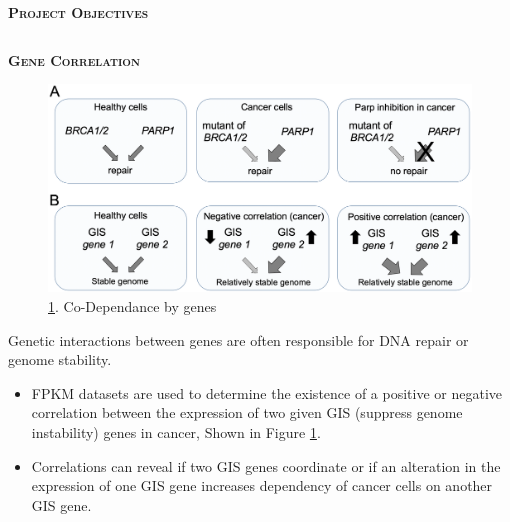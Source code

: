 \documentclass[final,t]{beamer}
\begin{document}
\begin{frame}{}
\begin{columns}[t]
\begin{column}{1\linewidth}
\begin{block}{\textsc{\textbf{Project Objectives}}}
                    \vspace*{6mm}
                \end{block}
			\end{column}
		\end{columns}


		\begin{columns}

%
%
            \begin{column}{.5\linewidth}
%
%
			\begin{block}{\textsc{\textbf{Gene Correlation}}}
				\vspace*{3mm}
				\begin{figure}
					\centering
					\includegraphics[scale = 0.6]{graphics/braca.png}
					\caption{\ref{fig:braca}. Co-Dependance by genes}
					\label{fig:braca}
					\end{figure}
Genetic interactions between genes are often responsible for DNA repair or genome stability.

				\begin{itemize}
					\item FPKM datasets are used to determine the existence of a positive or negative correlation between the expression of two given GIS (suppress genome instability) genes in cancer, Shown in Figure \ref{fig:braca}.
					\item Correlations can reveal if two GIS genes coordinate or if an alteration in the expression of one GIS gene increases dependency of cancer cells on another GIS gene.
				\end{itemize}
				\vspace*{3mm}
			\end{block}
%
%


\end{column}
\end{columns}
\end{frame}
\end{document}
